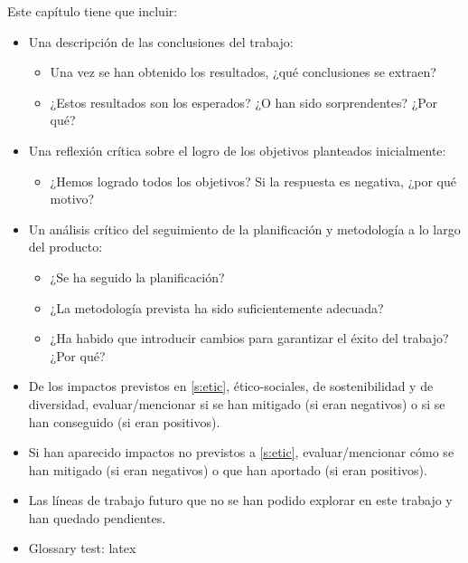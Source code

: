 \documentclass[ENG, BIB]{TFUOC}%
\begin{document}
Este capítulo tiene que incluir:
\begin{itemize}
\item Una descripción de las conclusiones del trabajo:
\begin{itemize}
    \item Una vez se han obtenido los resultados, ¿qué conclusiones se extraen?
    \item ¿Estos resultados son los esperados? ¿O han sido sorprendentes? ¿Por qué? 
\end{itemize}
\item Una reflexión crítica sobre el logro de los objetivos planteados inicialmente:
\begin{itemize}
    \item ¿Hemos logrado todos los objetivos? Si la respuesta es negativa, ¿por qué motivo?
\end{itemize}
\item Un análisis crítico del seguimiento de la planificación y metodología a lo largo del producto:
\begin{itemize}
    \item ¿Se ha seguido la planificación?
    \item ¿La metodología prevista ha sido suficientemente adecuada?
    \item ¿Ha habido que introducir cambios para garantizar el éxito del trabajo? ¿Por qué? 
\end{itemize}
\item De los impactos previstos en \ref{s:etic}, ético-sociales, de sostenibilidad y de diversidad, evaluar/mencionar si se han mitigado (si eran negativos) o si se han conseguido (si eran positivos). 
\item Si han aparecido impactos no previstos a \ref{s:etic}, evaluar/mencionar cómo se han mitigado (si eran negativos) o que han aportado (si eran positivos).
\item Las líneas de trabajo futuro que no se han podido explorar en este trabajo y han quedado pendientes.
\item Glossary test:  \gls{latex}


\end{itemize}
\end{document}
